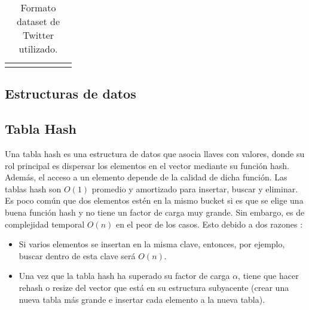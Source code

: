 \begin{table}[h!]
{\begin{tabular}{ccccccc}
\multicolumn{1}{l}{}                      & \multicolumn{1}{l}{}                                                             & \multicolumn{1}{l}{}                                                               & \multicolumn{1}{l}{}                                                                   & \multicolumn{1}{l}{}                                                                   & \multicolumn{1}{l}{}                                                                     & \multicolumn{1}{l}{}                                                                             
\end{tabular}}
\vspace{-0.5cm}
\caption{Formato dataset de Twitter utilizado.}
\label{tab:dataset}
\end{table}
\begin{multicols}{2}


\section{Estructuras de datos}

\subsection{Tabla Hash}
Una tabla hash es una estructura de datos que asocia llaves con valores, donde su rol principal es dispersar los elementos en el vector mediante su función hash. Además, el acceso a un elemento depende de la calidad de dicha función.
Las tablas hash son $O(1)$ promedio y amortizado para insertar, buscar y eliminar. Es poco común que dos elementos estén en la mismo bucket si es que se elige una buena función hash y no tiene un factor de carga muy grande. Sin embargo, es de complejidad temporal $O(n)$ en el peor de los casos. Esto debido a dos razones \cite{ajaxhispano}:

\begin{itemize}
    \item Si varios elementos se insertan en la misma clave, entonces, por ejemplo, buscar dentro de esta clave será $O(n)$.
    \item Una vez que la tabla hash ha superado su factor de carga $\alpha$, tiene que hacer rehash o resize del vector que está en su estructura subyacente (crear una nueva tabla más grande e insertar cada elemento a la nueva tabla).
\end{itemize}


\end{multicols}
